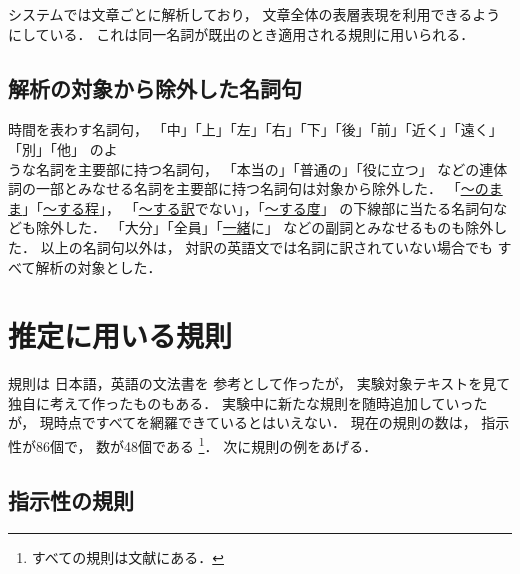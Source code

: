 システムでは文章ごとに解析しており，
文章全体の表層表現を利用できるようにしている．
これは同一名詞が既出のとき適用される規則に用いられる．


\subsection{解析の対象から除外した名詞句}
時間を表わす名詞句，
「中」\hspace*{-.5em}「上」\hspace*{-.5em}「左」\hspace*{-.5em}「右」\hspace*{-.5em}「下」\hspace*{-.5em}「後」\hspace*{-.5em}「前」\hspace*{-.5em}「近く」\hspace*{-.5em}「遠く」\hspace*{-.5em}
「別」\hspace*{-.5em}「他」
\hspace*{-.5em}
のよ\\うな名詞を主要部に持つ名詞句，
「本当の」「普通の」「役に立つ」
などの連体詞の一部とみなせる名詞を主要部に持つ名詞句は対象から除外した．
「\underline{〜のまま}」「\underline{〜する程}」，
「\underline{〜する訳}でない」，「\underline{〜する度}」
の下線部に当たる名詞句なども除外した．
\hspace*{-2mm}「大分」\hspace*{-2mm}「全員」\hspace*{-2mm}「\underline{一緒}に」\hspace*{-2mm}
などの副詞とみなせるものも除外した．
以上の名詞句以外は，
対訳の英語文では名詞に訳されていない場合でも
すべて解析の対象とした．


\section{推定に用いる規則}\label{sec:rule}

規則は
日本語，英語の文法書\cite{Kokuritukokugokenkyusho1978,Kumayama1985,Ikeuchi1985}を
参考として作ったが，
実験対象テキストを見て独自に考えて作ったものもある．
実験中に新たな規則を随時追加していったが，
現時点ですべてを網羅できているとはいえない．
現在の規則の数は，
指示性が86個で，
数が48個である
\footnote{
すべての規則は文献\cite{Murata1993A}にある．
}．
次に規則の例をあげる．

\subsection{指示性の規則}\label{subsec:abs_rule}

